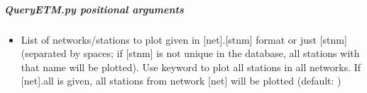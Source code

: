 \documentclass[letterpaper,10pt,english]{sphinxmanual}
\begin{document}
\begin{sphinxVerbatim}[commandchars=\\\{\}]
 \PYG{p}{[}\PYG{p}{]} \PYG{p}{[}    \PYG{p}{]} \PYG{p}{[} \PYG{p}{]} \PYG{p}{[} \PYG{p}{]}
            \PYG{p}{[}  \PYG{p}{[} \PYG{p}{]}\PYG{p}{]} \PYG{p}{[}\PYG{p}{]} \PYG{p}{[}\PYG{p}{]} \PYG{p}{[}\PYG{p}{]}
             \PYG{p}{[} \PYG{p}{]}
\end{sphinxVerbatim}


\subparagraph{QueryETM.py positional arguments}
\label{\detokenize{pgamit.com:QueryETM.py-positional-arguments}}\begin{itemize}
\item {} 
\sphinxAtStartPar
{\hyperref[\detokenize{pgamit.com:QueryETM.py-stnlist}]{}} \sphinxhyphen{} List of networks/stations to plot given in {[}net{]}.{[}stnm{]} format or just {[}stnm{]} (separated by spaces; if {[}stnm{]} is not unique in the database, all stations with that name will be plotted). Use keyword  to plot all stations in all networks. If {[}net{]}.all is given, all stations from network {[}net{]} will be plotted (default: )

\end{itemize}
\end{document}
